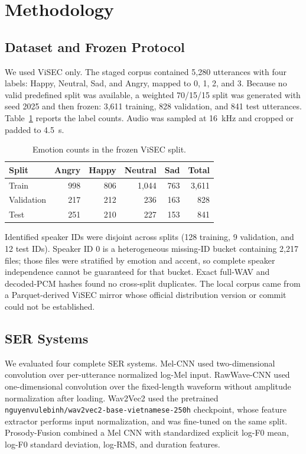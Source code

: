 \documentclass[a4paper,runningheads]{llncs}
\begin{document}
\section{Methodology}

\subsection{Dataset and Frozen Protocol}

We used ViSEC only. The staged corpus contained 5,280 utterances with four labels: Happy, Neutral, Sad, and Angry, mapped to 0, 1, 2, and 3. Because no valid predefined split was available, a weighted 70/15/15 split was generated with seed 2025 and then frozen: 3,611 training, 828 validation, and 841 test utterances. Table~\ref{tab:split} reports the label counts. Audio was sampled at 16~kHz and cropped or padded to 4.5~s.

\begin{table}[!htbp]
\caption{Emotion counts in the frozen ViSEC split.}
\label{tab:split}
\centering
\begin{tabular}{lrrrrr}
\hline
Split & Angry & Happy & Neutral & Sad & Total \\
\hline
Train & 998 & 806 & 1,044 & 763 & 3,611 \\
Validation & 217 & 212 & 236 & 163 & 828 \\
Test & 251 & 210 & 227 & 153 & 841 \\
\hline
\end{tabular}
\end{table}

Identified speaker IDs were disjoint across splits (128 training, 9 validation, and 12 test IDs). Speaker ID 0 is a heterogeneous missing-ID bucket containing 2,217 files; those files were stratified by emotion and accent, so complete speaker independence cannot be guaranteed for that bucket. Exact full-WAV and decoded-PCM hashes found no cross-split duplicates. The local corpus came from a Parquet-derived ViSEC mirror whose official distribution version or commit could not be established.

\subsection{SER Systems}

We evaluated four complete SER systems. Mel-CNN used two-dimensional convolution over per-utterance normalized log-Mel input. RawWave-CNN used one-dimensional convolution over the fixed-length waveform without amplitude normalization after loading. Wav2Vec2 used the pretrained \texttt{nguyenvulebinh/}\allowbreak\texttt{wav2vec2-base-}\allowbreak\texttt{vietnamese-250h} checkpoint, whose feature extractor performs input normalization, and was fine-tuned on the same split. Prosody-Fusion combined a Mel CNN with standardized explicit log-F0 mean, log-F0 standard deviation, log-RMS, and duration features.
\end{document}
